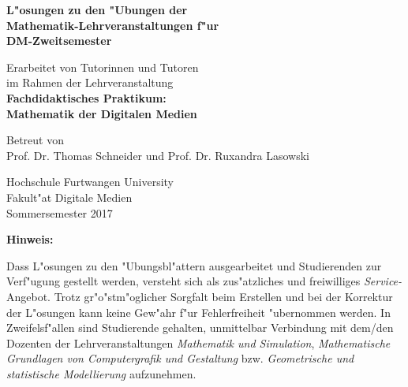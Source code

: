 \begin{titlepage}

\enlargethispage{3\baselineskip}
\HRule
\begin{center} \LARGE \textbf{L"osungen zu den "Ubungen der\\Mathematik-Lehrveranstaltungen f"ur\\DM-Zweitsemester}
\end{center}
\HRule


\begin{center}
{\Large Erarbeitet von Tutorinnen und Tutoren\\
im Rahmen der Lehrveranstaltung\\[2ex]
\textbf{Fachdidaktisches Praktikum:} \\
\textbf{Mathematik der Digitalen Medien}}
\end{center}


\begin{center}
{Betreut von\\
Prof. Dr. Thomas Schneider und Prof. Dr. Ruxandra Lasowski\\[2ex]
}
\end{center}


\HRule
\begin{center}
Hochschule Furtwangen University\\
Fakult"at Digitale Medien\\[1ex]
Sommersemester 2017
\end{center}
\HRule

\newpage
\thispagestyle{empty}

\textbf{Hinweis:}

Dass L"osungen zu den "Ubungsbl"attern ausgearbeitet und Studierenden zur Verf"ugung gestellt werden, versteht sich als zus"atzliches und freiwilliges \emph{Service-}Angebot. Trotz gr"o"stm"oglicher Sorgfalt beim Erstellen und bei der Korrektur der L"osungen kann keine Gew"ahr f"ur Fehlerfreiheit "ubernommen werden. In Zweifelsf"allen sind Studierende gehalten, unmittelbar Verbindung mit dem/den Dozenten der Lehrveranstaltungen \emph{Mathematik und Simulation}, \emph{Mathematische Grundlagen von Computergrafik und Gestaltung} bzw. \emph{Geometrische und statistische Modellierung} aufzunehmen.


\end{titlepage}
